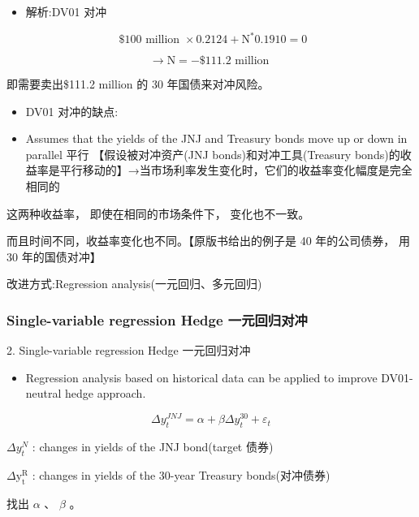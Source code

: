 \begin{itemize}
\item 解析:DV01 对冲
\end{itemize}

\[
\text{ \$100 million } \times  {0.2124} + {\mathrm{N}}^{ * }{0.1910} = 0
\]

\[
\rightarrow  \mathrm{N} =  - \$ {111.2}\text{ million }
\]

 即需要卖出\$111.2 million 的 30 年国债来对冲风险。

\begin{itemize}
\item DV01 对冲的缺点:
\end{itemize}

\begin{itemize}
\item Assumes that the yields of the JNJ and Treasury bonds move up or down in parallel 平行 【假设被对冲资产(JNJ bonds)和对冲工具(Treasury bonds)的收益率是平行移动的】→当市场利率发生变化时，它们的收益率变化幅度是完全相同的
\end{itemize}

这两种收益率， 即使在相同的市场条件下， 变化也不一致。

而且时间不同，收益率变化也不同。【原版书给出的例子是 40 年的公司债券， 用 30 年的国债对冲】

 改进方式:Regression analysis(一元回归、多元回归)



\subsubsection{ Single-variable regression Hedge 一元回归对冲 }

2. Single-variable regression Hedge 一元回归对冲

\begin{itemize}
\item Regression analysis based on historical data can be applied to improve DV01-neutral hedge approach.
\end{itemize}

\[
\Delta {y}_{t}^{JNJ} = \alpha  + {\beta \Delta }{y}_{t}^{30} + {\varepsilon }_{t}
\]

\(\Delta {y}_{t}^{N}\) : changes in yields of the JNJ bond(target 债券)

\(\Delta {\mathrm{y}}_{\mathrm{t}}^{\mathrm{R}}\) : changes in yields of the 30-year Treasury bonds(对冲债券)

找出 \(\alpha\) 、 \(\beta\) 。

